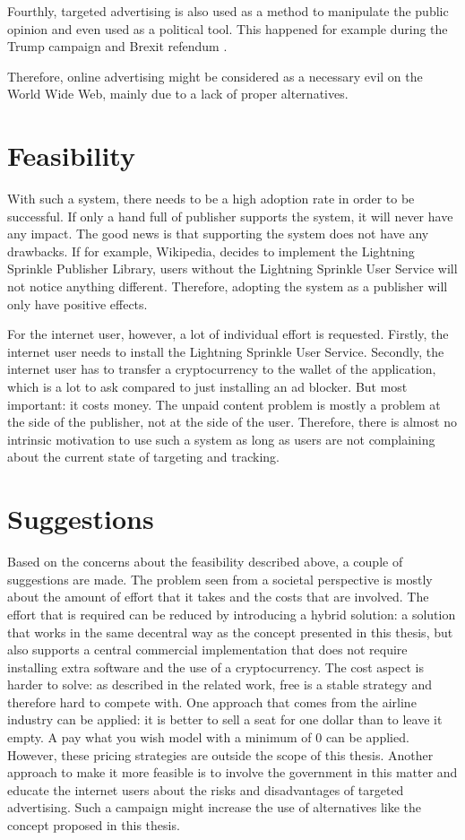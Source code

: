 Fourthly, targeted advertising is also used as a method to manipulate the public opinion and even used as a political tool. This happened for example during the Trump campaign and Brexit refendum \cite{cadwalladr2018cambridge}.

Therefore, online advertising might be considered as a necessary evil on the World Wide Web, mainly due to a lack of proper alternatives.

\section{Feasibility}
With such a system, there needs to be a high adoption rate in order to be successful. If only a hand full of publisher supports the system, it will never have any impact. The good news is that supporting the system does not have any drawbacks. If for example, Wikipedia, decides to implement the Lightning Sprinkle Publisher Library, users without the Lightning Sprinkle User Service will not notice anything different. Therefore, adopting the system as a publisher will only have positive effects.

For the internet user, however, a lot of individual effort is requested. Firstly, the internet user needs to install the Lightning Sprinkle User Service. Secondly, the internet user has to transfer a cryptocurrency to the wallet of the application, which is a lot to ask compared to just installing an ad blocker. 
But most important: it costs money. The unpaid content problem is mostly a problem at the side of the publisher, not at the side of the user. Therefore, there is almost no intrinsic motivation to use such a system as long as users are not complaining about the current state of targeting and tracking. 

\section{Suggestions}
Based on the concerns about the feasibility described above, a couple of suggestions are made. The problem seen from a societal perspective is mostly about the amount of effort that it takes and the costs that are involved. The effort that is required can be reduced by introducing a hybrid solution: a solution that works in the same decentral way as the concept presented in this thesis, but also supports a central commercial implementation that does not require installing extra software and the use of a cryptocurrency. The cost aspect is harder to solve: as described in the related work, free is a stable strategy and therefore hard to compete with. One approach that comes from the airline industry can be applied: it is better to sell a seat for one dollar than to leave it empty. A pay what you wish model with a minimum of 0 can be applied. However, these pricing strategies are outside the scope of this thesis. Another approach to make it more feasible is to involve the government in this matter and educate the internet users about the risks and disadvantages of targeted advertising. Such a campaign might increase the use of alternatives like the concept proposed in this thesis.


